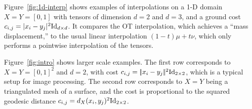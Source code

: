Figure~\ref{fig:1d-interp} shows examples of interpolations on a 1-D domain $X=Y=[0,1]$ with tensors of dimension $d=2$ and $d=3$, and a ground cost $c_{i,j}=|x_i-y_j|^2\mathrm{Id}_{d \times d}$. It compares the OT interpolation, which achieves a ``mass displacement,'' to the usual linear interpolation $(1-t)\mu+t\nu$, which only performs a pointwise interpolation of the tensors. 

Figure~\ref{fig:intro} shows larger scale examples. 
%
The first row corresponds to $X=Y=[0,1]^2$ and $d=2$, with cost $c_{i,j}=|\!| x_i-y_j |\!|^2\mathrm{Id}_{2 \times 2}$, which is a typical setup for image processing.
%
The second row corresponds to $X=Y$ being a triangulated mesh of a surface, and the cost is proportional to the squared geodesic distance $c_{i,j}=d_X(x_i,y_j)^2 \mathrm{Id}_{2\times 2}$. 


